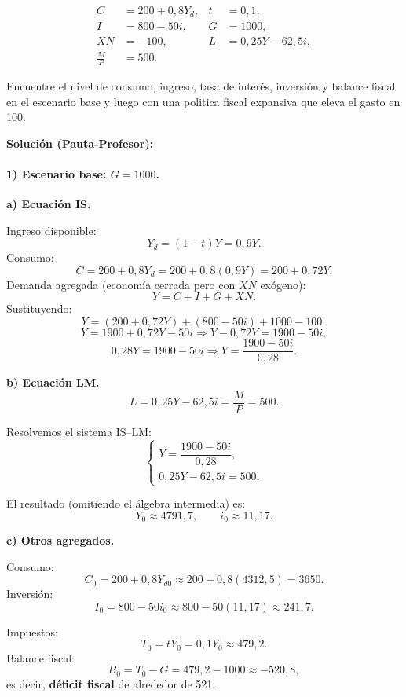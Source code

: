 \documentclass[11pt,addpoints]{article}
\begin{document}
\begin{align*}
C  &= 200 + 0{,}8Y_d,  & t          &= 0{,}1, \\
I  &= 800 - 50i,       & G          &= 1000, \\
XN &= -100,            & L          &= 0{,}25Y - 62{,}5i, \\
\frac{M}{P} &= 500.    &            &
\end{align*}


Encuentre el nivel de consumo, ingreso, tasa de interés, inversión y balance fiscal en el escenario base y luego con una politica fiscal expansiva que eleva el gasto en 100.

\vspace{0.2cm}
\textbf{Solución (Pauta-Profesor):}
\paragraph{1) Escenario base: $G = 1000$.}

\textbf{a) Ecuación IS.}

Ingreso disponible:
\[
Y_d = (1 - t)Y = 0{,}9Y.
\]
Consumo:
\[
C = 200 + 0{,}8Y_d = 200 + 0{,}8(0{,}9Y) = 200 + 0{,}72Y.
\]
Demanda agregada (economía cerrada pero con $XN$ exógeno):
\[
Y = C + I + G + XN.
\]
Sustituyendo:
\[
Y = (200 + 0{,}72Y) + (800 - 50i) + 1000 - 100,
\]
\[
Y = 1900 + 0{,}72Y - 50i \Rightarrow
Y - 0{,}72Y = 1900 - 50i,
\]
\[
0{,}28Y = 1900 - 50i \Rightarrow
Y = \frac{1900 - 50i}{0{,}28}.
\]

\textbf{b) Ecuación LM.}
\[
L = 0{,}25Y - 62{,}5i = \frac{M}{P} = 500.
\]

Resolvemos el sistema IS--LM:
\[
\begin{cases}
Y = \dfrac{1900 - 50i}{0{,}28},\\[0.3cm]
0{,}25Y - 62{,}5i = 500.
\end{cases}
\]

El resultado (omitiendo el álgebra intermedia) es:
\[
Y_0 \approx 4791{,}7,\qquad i_0 \approx 11{,}17.
\]

\textbf{c) Otros agregados.}

Consumo:
\[
C_0 = 200 + 0{,}8Y_{d0} \approx 200 + 0{,}8(4312{,}5) = 3650.
\]
Inversión:
\[
I_0 = 800 - 50i_0 \approx 800 - 50(11{,}17) \approx 241{,}7.
\]
\newpage
\vspace*{0.5cm}

Impuestos:
\[
T_0 = tY_0 = 0{,}1Y_0 \approx 479{,}2.
\]
Balance fiscal:
\[
B_0 = T_0 - G = 479{,}2 - 1000 \approx -520{,}8,
\]
es decir, \textbf{déficit fiscal} de alrededor de 521.
\end{document}
